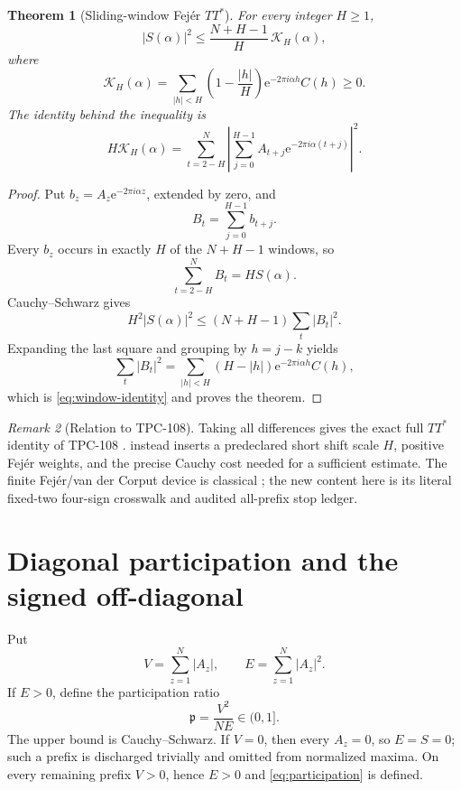 \documentclass[11pt]{article}
\newtheorem{theorem}{Theorem}[section]
\theoremstyle{definition}
\theoremstyle{remark}
\newtheorem{remark}[theorem]{Remark}
\newcommand{\e}{\mathrm e}
\begin{document}
\begin{theorem}[Sliding-window Fej\'er \(TT^*\)]
\label{thm:fejer}
For every integer \(H\ge1\),
\begin{equation}
\boxed{
 |S(\alpha)|^2
 \le
 \frac{N+H-1}{H}\,
 \mathcal K_H(\alpha),}
\label{eq:fejer-bound}
\end{equation}
where
\begin{equation}
 \mathcal K_H(\alpha)
 =
 \sum_{|h|<H}
 \left(1-\frac{|h|}{H}\right)
 \e^{-2\pi i\alpha h}C(h)
 \ge0.
\label{eq:fejer-energy}
\end{equation}
The identity behind the inequality is
\begin{equation}
 H\mathcal K_H(\alpha)
 =
 \sum_{t=2-H}^{N}
 \left|
 \sum_{j=0}^{H-1}
 A_{t+j}\e^{-2\pi i\alpha(t+j)}
 \right|^2.
\label{eq:window-identity}
\end{equation}
\end{theorem}

\begin{proof}
Put \(b_z=A_z\e^{-2\pi i\alpha z}\), extended by zero, and
\[
 B_t=\sum_{j=0}^{H-1}b_{t+j}.
\]
Every \(b_z\) occurs in exactly \(H\) of the \(N+H-1\) windows, so
\[
 \sum_{t=2-H}^{N}B_t=HS(\alpha).
\]
Cauchy--Schwarz gives
\[
 H^2|S(\alpha)|^2
 \le(N+H-1)\sum_t|B_t|^2.
\]
Expanding the last square and grouping by \(h=j-k\) yields
\[
 \sum_t|B_t|^2
 =
 \sum_{|h|<H}(H-|h|)
 \e^{-2\pi i\alpha h}C(h),
\]
which is \eqref{eq:window-identity} and proves the theorem.
\end{proof}

\begin{remark}[Relation to TPC-108]
Taking all differences gives the exact full \(TT^*\) identity of
TPC-108 \citep{WangTPC108}.   instead inserts a
predeclared short shift scale \(H\), positive Fej\'er weights, and
the precise Cauchy cost needed for a sufficient estimate.  The
finite Fej\'er/van der Corput device is classical
\citep[Chapter~8]{IwaniecKowalski2004}; the new content here is its
literal fixed-two four-sign crosswalk and audited all-prefix stop
ledger.
\end{remark}

\section{Diagonal participation and the signed off-diagonal}

Put
\begin{equation}
 V=\sum_{z=1}^N|A_z|,
\qquad
 E=\sum_{z=1}^N|A_z|^2.
\label{eq:VE}
\end{equation}
If \(E>0\), define the participation ratio
\begin{equation}
 \mathfrak p=\frac{V^2}{NE}\in(0,1].
\label{eq:participation}
\end{equation}
The upper bound is Cauchy--Schwarz.
If \(V=0\), then every \(A_z=0\), so \(E=S=0\); such a prefix is
discharged trivially and omitted from normalized maxima.  On every
remaining prefix \(V>0\), hence \(E>0\) and
\eqref{eq:participation} is defined.
\end{document}
